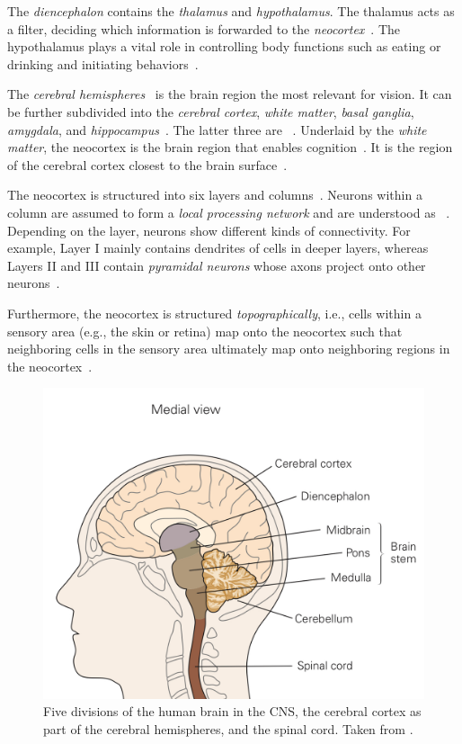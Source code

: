 The \textit{diencephalon} contains the \textit{thalamus} and \textit{hypothalamus}.
The thalamus acts as a filter, deciding which information is forwarded to the \textit{neocortex}~\citep[p. 341]{mack2013principles}.
The hypothalamus plays a vital role in controlling body functions such as eating or drinking and initiating behaviors~\citep[p. 341]{mack2013principles}.

The \textit{cerebral hemispheres}~\citep[p. 341]{mack2013principles} is the brain region the most relevant for vision.
It can be further subdivided into the \textit{cerebral cortex}, \textit{white matter}, \textit{basal ganglia}, \textit{amygdala}, and \textit{hippocampus}~\citep[p. 341]{mack2013principles}.
The latter three are ~\citep[p. 342]{mack2013principles}.
Underlaid by the \textit{white matter}, the neocortex is the brain region that enables cognition~\citep[pp. 341, 392]{mack2013principles}.
It is the region of the cerebral cortex closest to the brain surface~\citep[p. 345]{mack2013principles}.

The neocortex is structured into six layers and columns~\citep[p. 345]{mack2013principles}.
Neurons within a column are assumed to form a \textit{local processing network} and are understood as ~\citep[p. 348]{mack2013principles}.
Depending on the layer, neurons show different kinds of connectivity.
For example, Layer I mainly contains dendrites of cells in deeper layers, whereas Layers II and III contain \textit{pyramidal neurons} whose axons project onto other neurons~\citep[p. 346]{mack2013principles}.

Furthermore, the neocortex is structured \textit{topographically}, i.e., cells within a sensory area (e.g., the skin or retina) map onto the neocortex such that neighboring cells in the sensory area ultimately map onto neighboring regions in the neocortex~\citep[p. 343]{mack2013principles}.

\setcounter{figure}{0}
\begin{figure}
    \centering
    \includegraphics[width=.4\textwidth]{images/brain_regions.jpeg}
    \caption[Divisions of the human brain]{Five divisions of the human brain in the \ac{CNS}, the cerebral cortex as part of the cerebral hemispheres, and the spinal cord. Taken from \citet[p. 340]{mack2013principles}.}
    \label{fig:human_brain_divisions}
\end{figure}
\setcounter{figure}{2}

